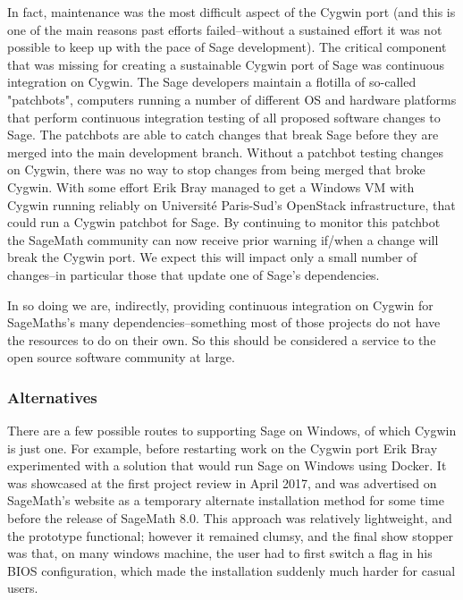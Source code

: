 In fact, maintenance was the most difficult aspect of the Cygwin port
(and this is one of the main reasons past efforts failed--without a
sustained effort it was not possible to keep up with the pace of Sage
development). The critical component that was missing for creating a
sustainable Cygwin port of Sage was continuous integration on Cygwin. The
Sage developers maintain a flotilla of so-called "patchbots", computers
running a number of different OS and hardware platforms that perform
continuous integration testing of all proposed software changes to Sage.
The patchbots are able to catch changes that break Sage before they are
merged into the main development branch. Without a patchbot testing
changes on Cygwin, there was no way to stop changes from being merged
that broke Cygwin. With some effort Erik Bray managed to get a Windows
VM with Cygwin running reliably on Université Paris-Sud's OpenStack
infrastructure, that could run a Cygwin patchbot for Sage. By continuing
to monitor this patchbot the SageMath community can now receive prior
warning if/when a change will break the Cygwin port. We expect this will
impact only a small number of changes--in particular those that update
one of Sage's dependencies.

In so doing we are, indirectly, providing continuous integration on
Cygwin for SageMaths's many dependencies--something most of those
projects do not have the resources to do on their own. So this should be
considered a service to the open source software community at large.

\hypertarget{alternatives}{%
\subsubsection{Alternatives}\label{alternatives}}

There are a few possible routes to supporting Sage on Windows, of which
Cygwin is just one. For example, before restarting work on the Cygwin
port Erik Bray experimented with a solution that would run Sage on
Windows using Docker.
It was showcased at the first project review in
April 2017, and was advertised on SageMath's website as a temporary
alternate installation method for some time before the release of
SageMath 8.0.
This approach was relatively lightweight, and the prototype functional;
however it remained clumsy, and the final show stopper was that, on many
windows machine, the user had to first switch a flag in his BIOS
configuration, which made the installation suddenly much harder for
casual users.

